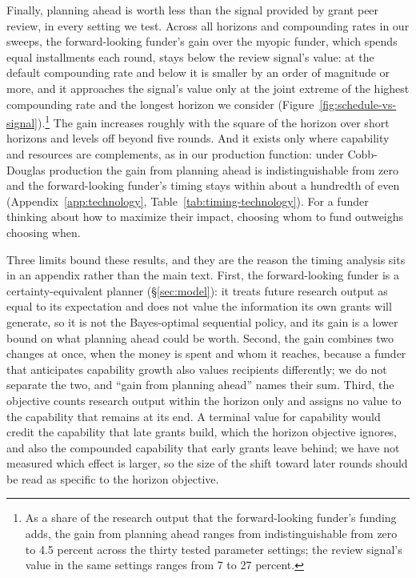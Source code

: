 Finally, planning ahead is worth less than the signal provided by grant peer review, in every setting we test. Across all horizons and compounding rates in our sweeps, the forward-looking funder's gain over the myopic funder, which spends equal installments each round, stays below the review signal's value: at the default compounding rate and below it is smaller by an order of magnitude or more, and it approaches the signal's value only at the joint extreme of the highest compounding rate and the longest horizon we consider (Figure~\ref{fig:schedule-vs-signal}).\footnote{As a share of the research output that the forward-looking funder's funding adds, the gain from planning ahead ranges from indistinguishable from zero to 4.5 percent across the thirty tested parameter settings; the review signal's value in the same settings ranges from 7 to 27 percent.} The gain increases roughly with the square of the horizon over short horizons and levels off beyond five rounds. And it exists only where capability and resources are complements, as in our production function: under Cobb-Douglas production the gain from planning ahead is indistinguishable from zero and the forward-looking funder's timing stays within about a hundredth of even (Appendix~\ref{app:technology}, Table~\ref{tab:timing-technology}). For a funder thinking about how to maximize their impact, choosing whom to fund outweighs choosing when.

Three limits bound these results, and they are the reason the timing analysis sits in an appendix rather than the main text. First, the forward-looking funder is a certainty-equivalent planner (\S\ref{sec:model}): it treats future research output as equal to its expectation and does not value the information its own grants will generate, so it is not the Bayes-optimal sequential policy, and its gain is a lower bound on what planning ahead could be worth. Second, the gain combines two changes at once, when the money is spent and whom it reaches, because a funder that anticipates capability growth also values recipients differently; we do not separate the two, and ``gain from planning ahead'' names their sum. Third, the objective counts research output within the horizon only and assigns no value to the capability that remains at its end. A terminal value for capability would credit the capability that late grants build, which the horizon objective ignores, and also the compounded capability that early grants leave behind; we have not measured which effect is larger, so the size of the shift toward later rounds should be read as specific to the horizon objective.


